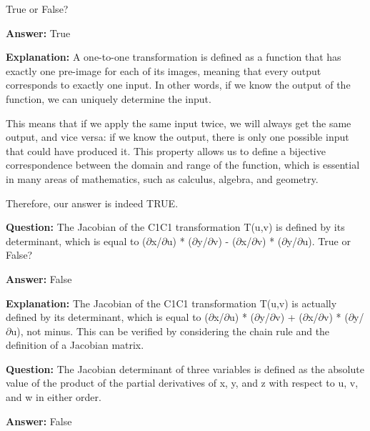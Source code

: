 \documentclass{article}
\begin{document}
True or False?
                
                \textbf{Answer:} True

                \textbf{Explanation:} A one-to-one transformation is defined as a function that has exactly one pre-image for each of its images, meaning that every output corresponds to exactly one input. In other words, if we know the output of the function, we can uniquely determine the input.

This means that if we apply the same input twice, we will always get the same output, and vice versa: if we know the output, there is only one possible input that could have produced it. This property allows us to define a bijective correspondence between the domain and range of the function, which is essential in many areas of mathematics, such as calculus, algebra, and geometry.

Therefore, our answer is indeed TRUE.
                
                \vspace{0.5cm} 
        
            
                \textbf {Question:} The Jacobian of the C1C1 transformation T(u,v) is defined by its determinant, which is equal to (\ensuremath{\partial}x/\ensuremath{\partial}u) * (\ensuremath{\partial}y/\ensuremath{\partial}v) - (\ensuremath{\partial}x/\ensuremath{\partial}v) * (\ensuremath{\partial}y/\ensuremath{\partial}u). True or False?
                
                \textbf{Answer:} False

                \textbf{Explanation:} The Jacobian of the C1C1 transformation T(u,v) is actually defined by its determinant, which is equal to (\ensuremath{\partial}x/\ensuremath{\partial}u) * (\ensuremath{\partial}y/\ensuremath{\partial}v) + (\ensuremath{\partial}x/\ensuremath{\partial}v) * (\ensuremath{\partial}y/\ensuremath{\partial}u), not minus. This can be verified by considering the chain rule and the definition of a Jacobian matrix.
                
                \vspace{0.5cm} 
        
            
                \textbf {Question:} The Jacobian determinant of three variables is defined as the absolute value of the product of the partial derivatives of x, y, and z with respect to u, v, and w in either order.
                
                \textbf{Answer:} False
\end{document}
